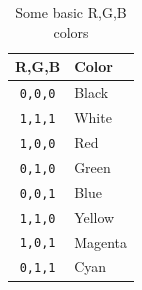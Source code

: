 \begin{table}[htp]
\caption{Some basic R,G,B colors}
\label{rgbcolors}
\begin{center}
\begin{tabular}{|c|l|}
\hline
\textbf{R,G,B} & \textbf{Color}\\
\hline
\texttt{0,0,0}  & Black\\
\texttt{1,1,1}  & White\\
\texttt{1,0,0}  & Red\\
\texttt{0,1,0}  & Green\\
\texttt{0,0,1}  & Blue\\
\texttt{1,1,0}  & Yellow\\
\texttt{1,0,1}  & Magenta\\
\texttt{0,1,1}  & Cyan\\
\hline
\end{tabular}
\end{center}
\end{table}



